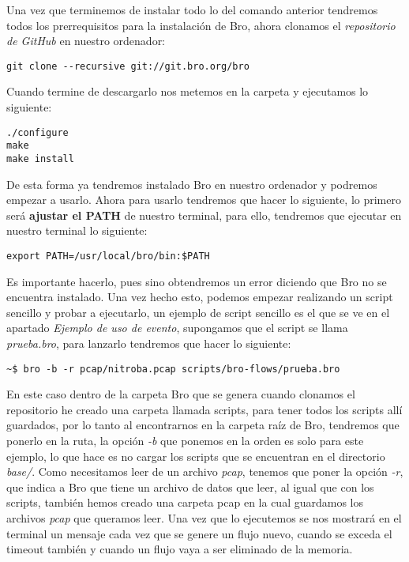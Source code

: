 \noindent Una vez que terminemos de instalar todo lo del comando anterior tendremos todos los 
prerrequisitos para la instalación de Bro, ahora clonamos el 
\textit{repositorio de GitHub} en nuestro ordenador:
\intro
\begin{lstlisting}[style=Consola]
git clone --recursive git://git.bro.org/bro
\end{lstlisting}

\noindent Cuando termine de descargarlo nos metemos en la carpeta y ejecutamos lo siguiente:
\intro
\begin{lstlisting}[style=Consola]
./configure
make
make install
\end{lstlisting}

\noindent De esta forma ya tendremos instalado Bro en nuestro ordenador y podremos empezar 
a usarlo.
\intro
Ahora para usarlo tendremos que hacer lo siguiente, lo primero será \textbf{ajustar el 
PATH} de nuestro terminal, para ello, tendremos que ejecutar en nuestro terminal 
lo siguiente:
\intro
\begin{lstlisting}[style=Consola]
export PATH=/usr/local/bro/bin:$PATH
\end{lstlisting}

\noindent Es importante hacerlo, pues sino obtendremos un error diciendo que Bro no se 
encuentra instalado. Una vez hecho esto, podemos empezar realizando un script 
sencillo y probar a ejecutarlo, un ejemplo de script sencillo es el que se ve 
en el apartado \textit{Ejemplo  de uso de evento}, 
supongamos que el script se llama \textit{prueba.bro}, para lanzarlo tendremos 
que hacer lo siguiente:
\intro
\begin{lstlisting}[style=Consola]
~$ bro -b -r pcap/nitroba.pcap scripts/bro-flows/prueba.bro
\end{lstlisting}

\noindent En este caso dentro de la carpeta Bro que se genera cuando clonamos el 
repositorio he creado una carpeta llamada scripts, para tener todos los 
scripts allí guardados, por lo tanto al encontrarnos en la carpeta raíz 
de Bro, tendremos que ponerlo en la ruta, la opción \textit{-b} que ponemos en la 
orden es solo para este ejemplo, lo que hace es no cargar los scripts 
que se encuentran en el directorio \textit{base/}. Como necesitamos leer de un 
archivo \textit{pcap}, tenemos que poner la opción \textit{-r}, que indica a Bro que tiene 
un archivo de datos que leer, al igual que con los scripts, también hemos 
creado una carpeta pcap en la cual guardamos los archivos \textit{pcap} que queramos 
leer. Una vez que lo ejecutemos se nos mostrará en el terminal un mensaje 
cada vez que se genere un flujo nuevo, cuando se exceda el timeout también 
y cuando un flujo vaya a ser eliminado de la memoria.

